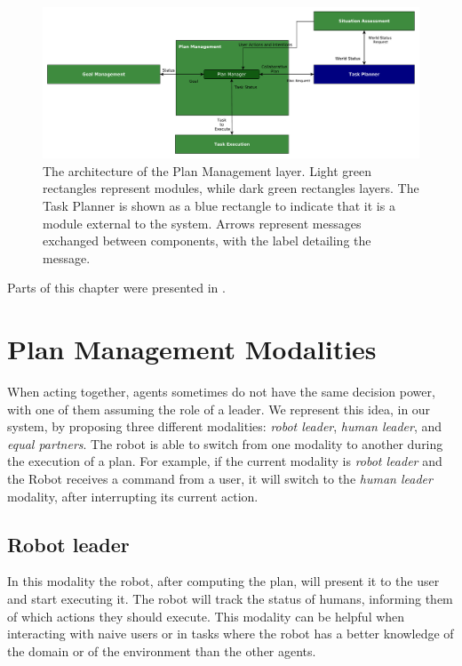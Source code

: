 \afterpage{\clearpage}
\begin{figure}
	\centering
	\includegraphics[scale=0.5]{img/coworker/plan_management/plan_management_architecture.pdf}
	\caption[The architecture of the Plan Management layer]{The architecture of the Plan Management layer. Light green rectangles represent modules, while dark green rectangles layers. The Task Planner is shown as a blue rectangle to indicate that it is a module external to the system. Arrows represent messages exchanged between components, with the label detailing the message.}
	\label{fig:plan_management-architecture}
\end{figure}


Parts of this chapter were presented in \cite{Lallement2014,fioreiser2014}.

\section{Plan Management Modalities}
\label{sec:plan_management-modalities}
When acting together, agents sometimes do not have the same decision power, with one of them assuming the role of a leader. We represent this idea, in our system, by proposing three different modalities: \textit{robot leader}, \textit{human leader}, and \textit{equal partners}. The robot is able to switch from one modality to another during the execution of a plan. For example, if the current modality is \textit{robot leader} and the Robot receives a command from a user, it will switch to the \textit{human leader} modality, after interrupting its current action.

\subsection{Robot leader}
\label{subsec:plan_management-robot_leader}
In this modality the robot, after computing the plan, will present it to the user and start executing it. The robot will track the status of humans, informing them of which actions they should execute. This modality can be helpful when interacting with  naive users or in tasks where the robot has a better knowledge of the  domain or of the environment than the other agents.

